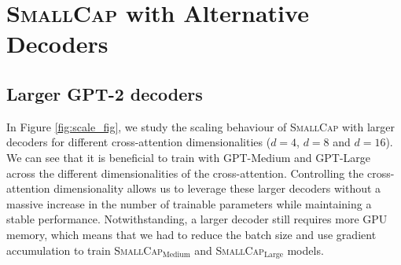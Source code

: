 \documentclass[10pt,twocolumn,letterpaper]{article}
\newcommand{\model}{\textsc{SmallCap}\xspace}
\begin{document}


\section{\model with Alternative Decoders}
\label{app:scaling_dec}


\subsection{Larger GPT-2 decoders}

In Figure \ref{fig:scale_fig}, we study the  scaling behaviour of \model with larger decoders for different cross-attention dimensionalities ($d=4$, $d=8$ and $d=16$). We can see that it is beneficial to train with GPT-Medium
and GPT-Large across the different dimensionalities of the cross-attention. 
Controlling the cross-attention dimensionality allows us to leverage these larger decoders without a massive increase in the number of trainable parameters while maintaining a stable performance. Notwithstanding, a larger decoder still requires more GPU memory, which means that we had to reduce the batch size and use gradient accumulation to train \model$_{\text{Medium}}$ and \model$_{\text{Large}}$ models.
\end{document}
